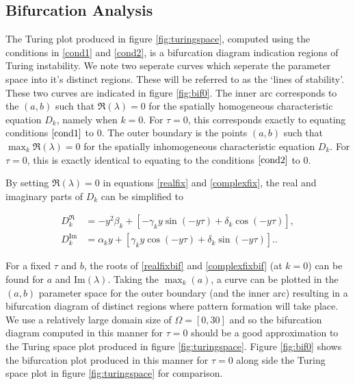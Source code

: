 \documentclass[12pt]{report}
\begin{document}
\subsection{Bifurcation Analysis}\label{section:fixedbif}
The Turing plot produced in figure \ref{fig:turingspace}, computed using the conditions in \eqref{cond1} and \eqref{cond2}, is a bifurcation diagram indication regions of Turing instability. We note two seperate curves which seperate the parameter space into it's distinct regions. These will be referred to as the `lines of stability'.
These two curves are indicated in figure \ref{fig:bif0}. The inner arc corresponds to the $(a,b)$ such that $\Re(\lambda)=0$ for the
spatially homogeneous characteristic equation $D_k$, namely when $k=0$. For $\tau=0$, this corresponds exactly to equating conditions $\eqref{cond1}$ to 0. The outer boundary is the points $(a,b)$ such that $\max_k\Re(\lambda)=0$ for the spatially inhomogeneous characteristic equation $D_k$. For $\tau=0$, this is exactly identical to equating to the conditions $\eqref{cond2}$ to 0.

By setting $\Re(\lambda)=0$ in equations \eqref{realfix} and \eqref{complexfix}, the real and imaginary parts of $D_k$ can be simplified to

\begin{align}\label{realfixbif}
  D_k^{\Re}&=-y^2\beta_k+[-\gamma_ky\sin(-y\tau)+\delta_k\cos(-y\tau)],\\
  D_k^{\text{Im}}&=\alpha_ky+[\gamma_ky\cos(-y\tau)+\delta_k\sin(-y\tau)].\label{complexfixbif}.
\end{align}


For a fixed $\tau$ and $b$, the roots of \eqref{realfixbif} and \eqref{complexfixbif} (at $k=0$) can be found for $a$ and $\text{Im}(\lambda)$.
Taking the $\max_k(a)$, a curve can be plotted in the $(a,b)$ parameter space for the outer boundary (and the inner arc) resulting in a bifurcation diagram of distinct regions where pattern formation will take place. We use a relatively large domain size of $\Omega=[0,30]$ and so the bifurcation diagram computed in this manner for $\tau=0$ should be a good approximation to the Turing space plot produced in figure \ref{fig:turingspace}. Figure \ref{fig:bif0} shows the bifurcation plot produced in this manner for $\tau=0$ along side the Turing space plot in figure \ref{fig:turingspace} for comparison.
\end{document}
